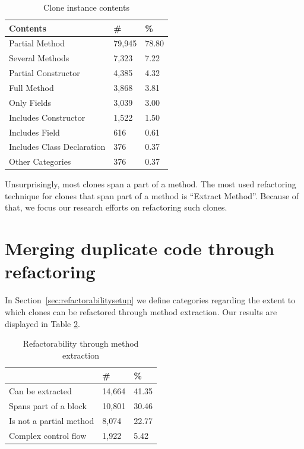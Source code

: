 \begin{table}[H]
  \begin{center}
  \caption{Clone instance contents} \label{table:contents}
  \medskip
\begin{tabular}{|l|l|l|}
  \hline
  \textbf{Contents} & \textbf{\#} & \textbf{\%} \\ \hline
  Partial Method     & 79,945 & 78.80 \\ \hline
  Several Methods         & 7,323 & 7.22 \\ \hline
  Partial Constructor      & 4,385 & 4.32 \\ \hline
  Full Method           & 3,868 & 3.81 \\ \hline
  Only Fields           & 3,039 & 3.00 \\ \hline
  Includes Constructor  & 1,522 & 1.50 \\ \hline
  Includes Field        & 616 & 0.61 \\ \hline
  Includes Class Declaration  & 376 & 0.37 \\ \hline
  Other Categories    & 376 & 0.37\\ \hline
\end{tabular}
\end{center}
\end{table}

Unsurprisingly, most clones span a part of a method. The most used refactoring technique for clones that span part of a method is ``Extract Method''. Because of that, we focus our research efforts on refactoring such clones.

\section{Merging duplicate code through refactoring} \label{sec:refactorability}
In Section~\ref{sec:refactorabilitysetup} we define categories regarding the extent to which clones can be refactored through method extraction. Our results are displayed in Table \ref{table:refactorability}.

\begin{table}[H]
  \begin{center}
  \caption{Refactorability through method extraction} \label{table:refactorability}
  \medskip
\begin{tabular}{|l|l|l|}
\hline
\textbf{}         & \textbf{\#} & \textbf{\%} \\ \hline
Can be extracted     & 14,664 & 41.35 \\ \hline
Spans part of a block  & 10,801 & 30.46 \\ \hline
Is not a partial method   & 8,074 & 22.77 \\ \hline
Complex control flow & 1,922 & 5.42 \\ \hline
\end{tabular}
\end{center}
\end{table}

